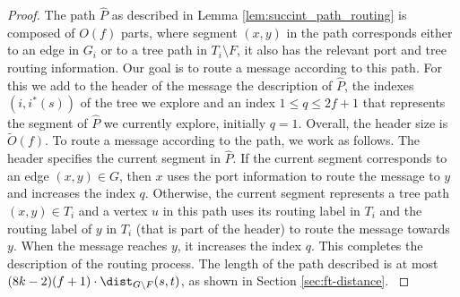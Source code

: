 \begin{proof}
{The path $\widehat{P}$ as described in Lemma \ref{lem:succint_path_routing} is composed of $O(f)$ parts, where segment $(x,y)$ in the path corresponds either to an edge in $G_i$ or to a tree path in $T_i \setminus F$, it also has the relevant port and tree routing information. Our goal is to route a message according to this path. For this we add to the header of the message the description of $\widehat{P}$, the indexes $(i,i^*(s))$ of the tree we explore and an index $1 \leq q \leq 2f+1$ that represents the segment of $\widehat{P}$ we currently explore, initially $q=1$. Overall, the header size is $\widetilde{O}(f)$. To route a message according to the path, we work as follows. The header specifies the current segment in $\widehat{P}$. If the current segment corresponds to an edge $(x,y) \in G$, then $x$ uses the port information to route the message to $y$ and increases the index $q$. Otherwise, the current segment represents a tree path $(x,y) \in T_i$ and a vertex $u$ in this path uses its routing label in $T_i$ and the routing label of $y$ in $T_i$ (that is part of the header) to route the message towards $y$. When the message reaches $y$, it increases the index $q$. This completes the description of the routing process. The length of the path described is at most $(8k-2)(f+1)\cdot \dist_{G\setminus F}(s,t)$, as shown in Section  \ref{sec:ft-distance}. } 
\end{proof}



